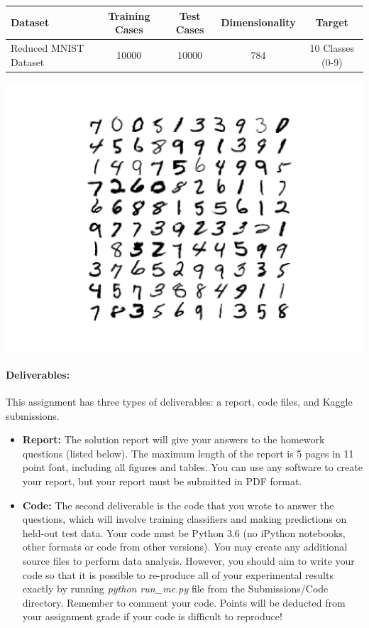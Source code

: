 \documentclass[letterpaper]{article}
\begin{document}
\begin{table}[h!]
\center
\begin{tabular}{|l|c|c|c|c|}\hline
Dataset & Training Cases & Test Cases & Dimensionality & Target \\\hline\hline
Reduced MNIST Dataset & 10000 & 10000 & 784 & 10 Classes (0-9) \\\hline
\end{tabular}
\end{table}
\begin{center}
    \includegraphics[scale=0.5]{mnist.png}
\end{center}

\paragraph*{Deliverables:} This assignment has three types of deliverables: a report, code files, and Kaggle submissions. 
\begin{itemize}
\item \textbf{Report: } The solution report will give your answers to the homework questions (listed below). The maximum length of the report is 5 pages in 11 point font, including all figures and tables. You can use any software to create your report, but your report must be submitted in PDF format. 

\item \textbf{Code: } The second deliverable is the code that you wrote to answer the questions, which will involve training classifiers and making predictions on held-out test data. Your code must be Python 3.6 (no iPython notebooks, other formats or code from other versions). You may create any additional source files to perform data analysis. However, you should aim to write your code so that it is possible to re-produce all of your experimental results exactly by running \textit{python run\_me.py} file from the Submissions/Code directory. Remember to comment your code. Points will be deducted from your assignment grade if your code is difficult to reproduce!

\end{itemize}
\end{document}
